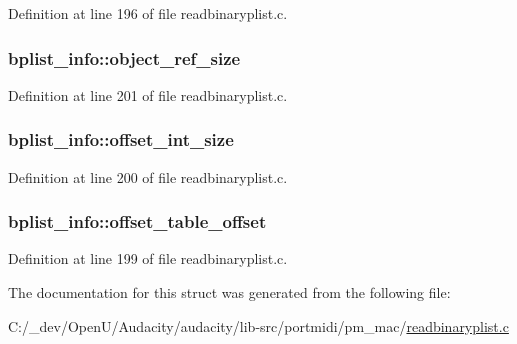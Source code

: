 Definition at line 196 of file readbinaryplist.\+c.

\subsubsection[{\texorpdfstring{object\+\_\+ref\+\_\+size}{object_ref_size}}]{ bplist\+\_\+info\+::object\+\_\+ref\+\_\+size}\hypertarget{structbplist__info_ab8d0fc75c50cbbb4ae8ac400482d14bd}{}\label{structbplist__info_ab8d0fc75c50cbbb4ae8ac400482d14bd}


Definition at line 201 of file readbinaryplist.\+c.

\subsubsection[{\texorpdfstring{offset\+\_\+int\+\_\+size}{offset_int_size}}]{ bplist\+\_\+info\+::offset\+\_\+int\+\_\+size}\hypertarget{structbplist__info_ab8fd5fa265f809e0ed0f245a1ae71ad6}{}\label{structbplist__info_ab8fd5fa265f809e0ed0f245a1ae71ad6}


Definition at line 200 of file readbinaryplist.\+c.

\subsubsection[{\texorpdfstring{offset\+\_\+table\+\_\+offset}{offset_table_offset}}]{ bplist\+\_\+info\+::offset\+\_\+table\+\_\+offset}\hypertarget{structbplist__info_ab999b6c7a605a4b0f9ba31d8ff10dc7f}{}\label{structbplist__info_ab999b6c7a605a4b0f9ba31d8ff10dc7f}


Definition at line 199 of file readbinaryplist.\+c.



The documentation for this struct was generated from the following file\+:\begin{DoxyCompactItemize}
\item 
C\+:/\+\_\+dev/\+Open\+U/\+Audacity/audacity/lib-\/src/portmidi/pm\+\_\+mac/\hyperlink{readbinaryplist_8c}{readbinaryplist.\+c}\end{DoxyCompactItemize}

